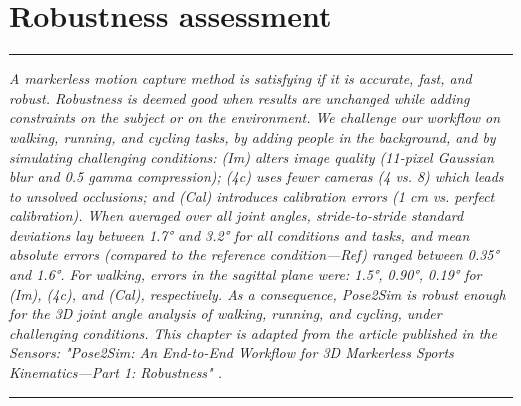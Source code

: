 
\lhead[\fancyplain{}{\leftmark}]%
      {\fancyplain{}{}} %
\chead[\fancyplain{}{}]%
      {\fancyplain{}{}}
\rhead[\fancyplain{}{}]%
      {\fancyplain{}{\rightmark}}%
\lfoot[\fancyplain{}{}]%
      {\fancyplain{}{}}
\cfoot[\fancyplain{}{\thepage}]%
      {\fancyplain{}{\thepage}} %
\rfoot[\fancyplain{}{}]%
     {\fancyplain{}{\scriptsize}}



\chapter{Robustness assessment}
\label{ch:4}


\begin{center}
\rule{0.7\linewidth}{.5pt}
\begin{minipage}{0.7\linewidth}
\smallskip

\textit{A markerless motion capture method is satisfying if it is accurate, fast, and robust. Robustness is deemed good when results are unchanged while adding constraints on the subject or on the environment. We challenge our workflow on walking, running, and cycling tasks, by adding people in the background, and by simulating challenging conditions: (Im) alters image quality (11-pixel Gaussian blur and 0.5 gamma compression); (4c) uses fewer cameras (4 vs. 8) which leads to unsolved occlusions; and (Cal) introduces calibration errors (1 cm vs. perfect calibration).\newline \newline
When averaged over all joint angles, stride-to-stride standard deviations lay between 1.7° and 3.2° for all conditions and tasks, and mean absolute errors (compared to the reference condition—Ref) ranged between 0.35° and 1.6°. For walking, errors in the sagittal plane were: 1.5°, 0.90°, 0.19° for (Im), (4c), and (Cal), respectively. As a consequence, Pose2Sim is robust enough for the 3D joint angle analysis of walking, running, and cycling, under challenging conditions. \newline\newline
This chapter is adapted from the article published in the Sensors: "Pose2Sim: An End-to-End Workflow for 3D Markerless Sports Kinematics—Part 1: Robustness" \cite{Pagnon2021}.
}


\end{minipage}
\smallskip
\rule{0.7\linewidth}{.5pt}
\end{center}

